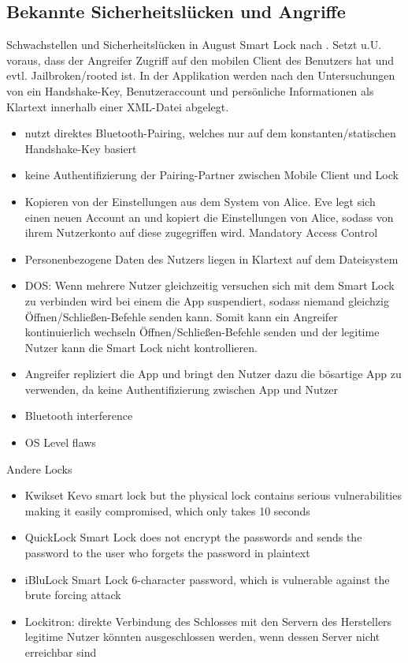 \subsection{Bekannte Sicherheitslücken und Angriffe}
\label{sec:analysis_weaknesses}
    Schwachstellen und Sicherheitslücken in August Smart Lock nach \citeauthor{Ye2017}.
	Setzt u.U. voraus, dass der Angreifer Zugriff auf den mobilen Client des Benutzers hat und evtl. Jailbroken/rooted ist.
	In der Applikation werden nach den Untersuchungen von \citeauthor{Ye2017} ein Handshake-Key, Benutzeraccount und persönliche Informationen als Klartext innerhalb einer XML-Datei abgelegt.
	\begin{itemize}
		\item nutzt direktes Bluetooth-Pairing, welches nur auf dem konstanten/statischen Handshake-Key basiert
		\item keine Authentifizierung der Pairing-Partner zwischen Mobile Client und Lock
		\item Kopieren von der Einstellungen aus dem System von Alice.
		    Eve legt sich einen neuen Account an und kopiert die Einstellungen von Alice, sodass von ihrem Nutzerkonto auf diese zugegriffen wird. \textrightarrow Mandatory Access Control
		\item Personenbezogene Daten des Nutzers liegen in Klartext auf dem Dateisystem
		\item DOS: Wenn mehrere Nutzer gleichzeitig versuchen sich mit dem Smart Lock zu verbinden wird bei einem die App suspendiert, sodass niemand gleichzig Öffnen/Schließen-Befehle senden kann.
		    Somit kann ein Angreifer kontinuierlich wechseln Öffnen/Schließen-Befehle senden und der legitime Nutzer kann die Smart Lock nicht kontrollieren.
	   \item Angreifer repliziert die App und bringt den Nutzer dazu die bösartige App zu verwenden, da keine Authentifizierung zwischen App und Nutzer
	   \item Bluetooth interference
	   \item OS Level flaws
	\end{itemize}

	Andere Locks
	\begin{itemize}
		\item Kwikset Kevo smart lock but the physical lock contains serious vulnerabilities making it easily compromised, which only takes 10 seconds\cite{Ye2017}
		\item QuickLock Smart Lock does not encrypt the passwords and sends the password to the user who forgets the password in plaintext\cite{Ye2017}
		\item iBluLock Smart Lock 6-character password, which is vulnerable against the brute forcing attack\cite{Ye2017}
		\item Lockitron: direkte Verbindung des Schlosses mit den Servern des Herstellers \textrightarrow legitime Nutzer könnten ausgeschlossen werden, wenn dessen Server nicht erreichbar sind
	\end{itemize}
	
